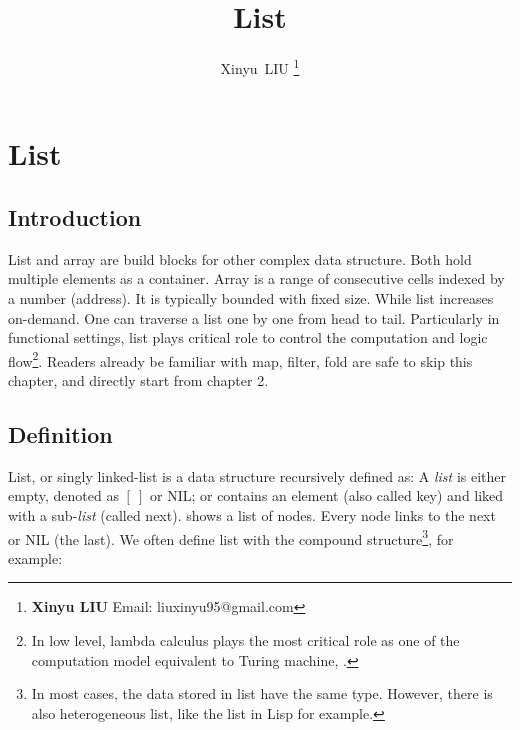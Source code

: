 \documentclass[b5paper]{article}
\begin{document}
\title{List}

\author{Xinyu~LIU
\thanks{{\bfseries Xinyu LIU} \newline
  Email: liuxinyu95@gmail.com \newline}
  }

\maketitle
\fi


\ifx\wholebook\relax
\chapter{List}
\fi

\section{Introduction}
\label{introduction}

List and array are build blocks for other complex data structure. Both hold multiple elements as a container. Array is a range of consecutive cells indexed by a number (address). It is typically bounded with fixed size. While list increases on-demand. One can traverse a list one by one from head to tail. Particularly in functional settings, list plays critical role to control the computation and logic flow\footnote{In low level, lambda calculus plays the most critical role as one of the computation model equivalent to Turing machine\cite{mittype}, \cite{unplugged}.}. Readers already be familiar with map, filter, fold are safe to skip this chapter, and directly start from chapter 2.

\section{Definition}

List, or singly linked-list is a data structure recursively defined as: A {\em list} is either empty, denoted as $[\ ]$ or NIL; or contains an element (also called key) and liked with a sub-{\em list} (called next).  shows a list of nodes. Every node links to the next or NIL (the last). We often define list with the compound structure\footnote{In most cases, the data stored in list have the same type. However, there is also heterogeneous list, like the list in Lisp for example.}, for example:
\end{document}

